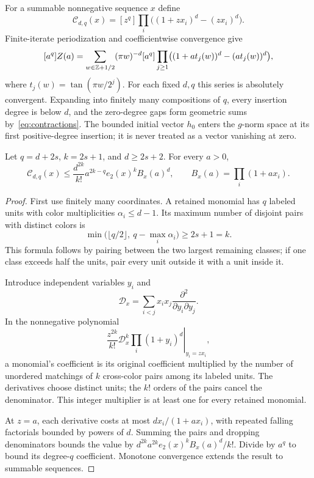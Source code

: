 \documentclass[11pt,a4paper]{article}
\theoremstyle{remark}\newtheorem*{ednote}{Editorial note (ProveIt, 2026-10-01)}
\begin{document}
For a summable nonnegative sequence $x$ define
\[
\mathcal C_{d,q}(x)=[z^q]\prod_i\bigl((1+zx_i)^d-(zx_i)^d\bigr).
\]
Finite-iterate periodization and coefficientwise convergence give
\begin{equation}\label{eq:cappedorbit}
[a^q]Z(a)=\sum_{w\in\mathbb Z+1/2}(\pi w)^{-d}
[a^q]\prod_{j\ge1}\bigl((1+a t_j(w))^d-(a t_j(w))^d\bigr),
\end{equation}
where $t_j(w)=\tan(\pi w/2^j)$. For each fixed $d,q$ this series is absolutely convergent. Expanding into finitely many compositions of $q$, every insertion degree is below $d$, and the zero-degree gaps form geometric sums by~\eqref{eq:contractions}. The bounded initial vector $h_0$ enters the $g$-norm space at its first positive-degree insertion; it is never treated as a vector vanishing at zero.

\begin{lemma}\label{lem:marking}
Let $q=d+2s$, $k=2s+1$, and $d\ge2s+2$. For every $a>0$,
\begin{equation}\label{eq:marking}
\mathcal C_{d,q}(x)\le\frac{d^{2k}}{k!}a^{2k-q}e_2(x)^k B_x(a)^d,
\qquad B_x(a)=\prod_i(1+ax_i).
\end{equation}
\end{lemma}
\begin{proof}
First use finitely many coordinates. A retained monomial has $q$ labeled units with color multiplicities $\alpha_i\le d-1$. Its maximum number of disjoint pairs with distinct colors is
\[
\min\bigl(\lfloor q/2\rfloor,\ q-\max_i\alpha_i\bigr)\ge2s+1=k.
\]
This formula follows by pairing between the two largest remaining classes; if one class exceeds half the units, pair every unit outside it with a unit inside it.

Introduce independent variables $y_i$ and
\[
\mathcal D_x=\sum_{i<j}x_ix_j\frac{\partial^2}{\partial y_i\partial y_j}.
\]
In the nonnegative polynomial
\[
\frac{z^{2k}}{k!}\left.\mathcal D_x^k\prod_i(1+y_i)^d\right|_{y_i=zx_i},
\]
a monomial's coefficient is its original coefficient multiplied by the number of unordered matchings of $k$ cross-color pairs among its labeled units. The derivatives choose distinct units; the $k!$ orders of the pairs cancel the denominator. This integer multiplier is at least one for every retained monomial.

At $z=a$, each derivative costs at most $d x_i/(1+ax_i)$, with repeated falling factorials bounded by powers of $d$. Summing the pairs and dropping denominators bounds the value by $d^{2k}a^{2k}e_2(x)^kB_x(a)^d/k!$. Divide by $a^q$ to bound its degree-$q$ coefficient. Monotone convergence extends the result to summable sequences.
\end{proof}
\end{document}
